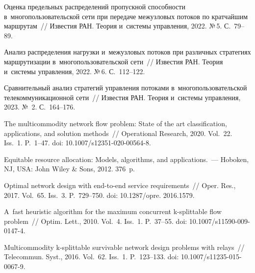 \begin{multicols}{2}

{\small\frenchspacing
 { %
 \begin{thebibliography}{99}

    
     Оцен\-ка 
предельных рас\-пре\-де\-ле\-ний  пропускной спо\-соб\-ности в~многопользовательской сети 
при  передаче  межузловых потоков  по кратчайшим  марш\-ру\-там~// Известия РАН. 
Тео\-рия и~сис\-те\-мы управ\-ле\-ния, 2022. №\,5. С.~79--89.

 Анализ 
рас\-пре\-де\-ле\-ния на\-груз\-ки и~межузловых потоков при различных стратегиях  
марш\-ру\-ти\-за\-ции  в~многопользовательской сети~// Известия РАН. Тео\-рия и~сис\-те\-мы 
управ\-ле\-ния, 2022. №\,6. С.~112--122.
    
Срав\-ни\-тель\-ный анализ стратегий  управ\-ле\-ния потоками в~многопользовательской 
телекоммуникационной сети~// Известия РАН. Тео\-рия и~сис\-те\-мы управ\-ле\-ния, 2023.  
№~2. С.~164--176.
    
     The 
multicommodity network flow problem: State of the art classification, 
applications, and solution methods~// Operational Research, 2020. Vol.~22. Iss.~1.  P.~1--47.
doi: 10.1007/s12351-020-00564-8.
    
     Equitable resource allocation: 
Models, algorithms, and applications.~--- Hoboken, NJ, USA: John Wiley \& Sons, 
2012. 376~p.
    
    Optimal network design with end-to-end service requirements~// Oper. Res., 
2017. Vol.~65. Iss.~3. P.~729--750. doi: 10.1287/opre. 2016.1579.
    
    
    
     A~fast heuristic 
algorithm for the maximum concurrent k-splittable flow problem~// Optim. Lett., 
2010. Vol.~4. Iss.~1. P.~37--55. doi: 10.1007/s11590-009-0147-4.


    
Multicommodity k-splittable survivable network design problems with relays~// 
Telecommun. Syst., 2016. Vol.~62. Iss.~1. P.~123--133. doi: 10.1007/s11235-015-0067-9.


\end{thebibliography}}}
\end{multicols}
